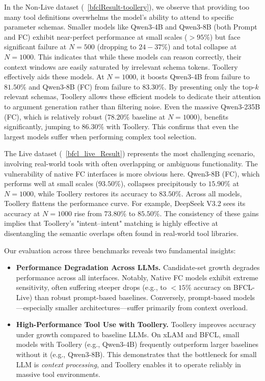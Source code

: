 \documentclass[11pt]{article}
\begin{document}
In the Non-Live dataset (~\ref{bfclResult-toollery}), we observe that providing too many tool definitions overwhelms the model's ability to attend to specific parameter schemas. Smaller models like Qwen3-4B and Qwen3-8B (both Prompt and FC) exhibit near-perfect performance at small scales ($>95\%$) but face significant failure at $N=500$ (dropping to $24-37\%$) and total collapse at $N=1000$. This indicates that while these models can reason correctly, their context windows are easily saturated by irrelevant schema tokens. Toollery effectively aids these models. At $N=1000$, it boosts Qwen3-4B from failure to $81.50\%$ and Qwen3-8B (FC) from failure to $83.30\%$. By presenting only the top-$k$ relevant schemas, Toollery allows these efficient models to dedicate their attention to argument generation rather than filtering noise. Even the massive Qwen3-235B (FC), which is relatively robust ($78.20\%$ baseline at $N=1000$), benefits significantly, jumping to $86.30\%$ with Toollery. This confirms that even the largest models suffer when performing complex tool selection.

The Live dataset (~\ref{bfcl_live_Result}) represents the most challenging scenario, involving real-world tools with often overlapping or ambiguous functionality. The vulnerability of native FC interfaces is more obvious here. Qwen3-8B (FC), which performs well at small scales ($93.50\%$), collapses precipitously to $15.90\%$ at $N=1000$, while Toollery restores its accuracy to $83.50\%$. Across all models, Toollery flattens the performance curve. For example, DeepSeek V3.2 sees its accuracy at $N=1000$ rise from $73.80\%$ to $85.50\%$. The consistency of these gains implies that Toollery's "intent--intent" matching is highly effective at disentangling the semantic overlaps often found in real-world tool libraries.


Our evaluation across three benchmarks reveals two fundamental insights:
\begin{itemize}
\item \textbf{Performance Degradation Across LLMs.} Candidate-set growth degrades performance across all interfaces. Notably, Native FC models exhibit extreme sensitivity, often suffering steeper drops (e.g., to $<15\%$ accuracy on BFCL-Live) than robust prompt-based baselines. Conversely, prompt-based models---especially smaller architectures---suffer primarily from context overload.
\item \textbf{High-Performance Tool Use with Toollery.} Toollery improves accuracy under growth compared to baseline LLMs. On xLAM and BFCL, small models with Toollery (e.g., Qwen3-4B) frequently outperform larger baselines without it (e.g., Qwen3-8B). This demonstrates that the bottleneck for small LLM is \textit{context processing}, and Toollery enables it to operate reliably in massive tool environments.
\end{itemize}
\end{document}
